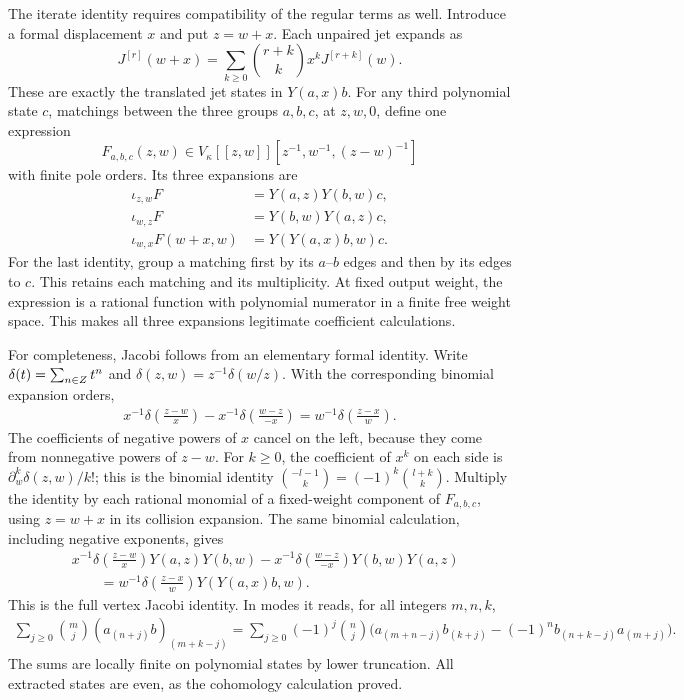 The iterate identity requires compatibility of the regular terms as
well.  Introduce a formal displacement $x$ and put $z=w+x$.
Each unpaired jet expands as
\[
 J^{[r]}(w+x)=\sum_{k\ge0}\binom{r+k}{k}x^kJ^{[r+k]}(w).
\]
These are exactly the translated jet states in $Y(a,x)b$.
For any third polynomial state $c$, matchings between the three groups
$a,b,c$, at $z,w,0$, define one expression
\[
 F_{a,b,c}(z,w)\in
 V_\kappa[[z,w]][z^{-1},w^{-1},(z-w)^{-1}]
\]
with finite pole orders.  Its three expansions are
\[
 \begin{aligned}
 \iota_{z,w}F&=Y(a,z)Y(b,w)c,\\
 \iota_{w,z}F&=Y(b,w)Y(a,z)c,\\
 \iota_{w,x}F(w+x,w)&=Y(Y(a,x)b,w)c.
 \end{aligned}
\]
For the last identity, group a matching first by its $a$--$b$ edges
and then by its edges to $c$.  This retains each matching and its
multiplicity.  At fixed output weight, the expression is a rational
function with polynomial numerator in a finite free weight space.
This makes all three expansions legitimate coefficient calculations.

For completeness, Jacobi follows from an elementary formal identity.
Write $\delta(t)=\sum_{n\in Z}t^n$ and
$\delta(z,w)=z^{-1}\delta(w/z)$.  With the corresponding binomial
expansion orders,
\[
 \begin{split}
 x^{-1}\delta\left(\frac{z-w}{x}\right)
 -x^{-1}\delta\left(\frac{w-z}{-x}\right)
 =w^{-1}\delta\left(\frac{z-x}{w}\right).
 \end{split}
\]
The coefficients of negative powers of $x$ cancel on the left,
because they come from nonnegative powers of $z-w$.  For $k\ge0$,
the coefficient of $x^k$ on each side is
$\partial_w^k\delta(z,w)/k!$; this is the binomial identity
$\binom{-l-1}{k}=(-1)^k\binom{l+k}{k}$.
Multiply the identity by each rational monomial of a fixed-weight
component of $F_{a,b,c}$, using $z=w+x$ in its collision expansion.
The same binomial calculation, including negative exponents, gives
\[
 \begin{split}
 &x^{-1}\delta\left(\frac{z-w}{x}\right)Y(a,z)Y(b,w)
 -x^{-1}\delta\left(\frac{w-z}{-x}\right)Y(b,w)Y(a,z)\\
 &\qquad=w^{-1}\delta\left(\frac{z-x}{w}\right)
                                     Y(Y(a,x)b,w).
 \end{split}
\]
This is the full vertex Jacobi identity.  In modes it reads, for all
integers $m,n,k$,
\[
 \begin{split}
 \sum_{j\ge0}\binom mj(a_{(n+j)}b)_{(m+k-j)}
 =\sum_{j\ge0}(-1)^j\binom nj
 \bigl(a_{(m+n-j)}b_{(k+j)}
       -(-1)^n b_{(n+k-j)}a_{(m+j)}\bigr).
 \end{split}
\]
The sums are locally finite on polynomial states by lower truncation.
All extracted states are even, as the cohomology calculation proved.

